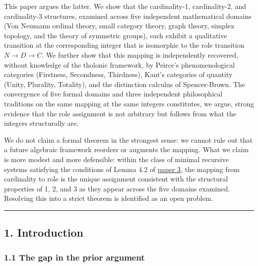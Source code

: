 \documentclass[
  11pt,
  letterpaper,
]{article}
\begin{document}
This paper argues the latter. We show that the cardinality-1,
cardinality-2, and cardinality-3 structures, examined across five
independent mathematical domains (Von Neumann ordinal theory, small
category theory, graph theory, simplex topology, and the theory of
symmetric groups), each exhibit a qualitative transition at the
corresponding integer that is isomorphic to the role transition
\(N \to D \to C\). We further show that this mapping is independently
recovered, without knowledge of the tholonic framework, by Peirce's
phenomenological categories (Firstness, Secondness, Thirdness), Kant's
categories of quantity (Unity, Plurality, Totality), and the distinction
calculus of Spencer-Brown. The convergence of five formal domains and
three independent philosophical traditions on the same mapping at the
same integers constitutes, we argue, strong evidence that the role
assignment is not arbitrary but follows from what the integers
structurally are.

We do not claim a formal theorem in the strongest sense: we cannot rule
out that a future algebraic framework reorders or augments the mapping.
What we claim is more modest and more defensible: within the class of
minimal recursive systems satisfying the conditions of Lemma 4.2 of
\href{https://github.com/baardev/truevalue/blob/main/docnav/Research/papers/3_minimal-recursive-triadic-framework/3_minimal-recursive-triadic-framework.pdf}{paper
3}, the mapping from cardinality to role is the unique assignment
consistent with the structural properties of 1, 2, and 3 as they appear
across the five domains examined. Resolving this into a strict theorem
is identified as an open problem.

\begin{center}\rule{0.5\linewidth}{0.5pt}\end{center}

\subsection{1. Introduction}\label{introduction}

\subsubsection{1.1 The gap in the prior
argument}\label{the-gap-in-the-prior-argument}
\end{document}
